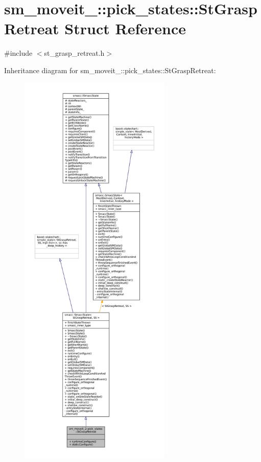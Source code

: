 \hypertarget{structsm__moveit__2_1_1pick__states_1_1StGraspRetreat}{}\section{sm\+\_\+moveit\+\_\+:\+:pick\+\_\+states\+:\+:St\+Grasp\+Retreat Struct Reference}
\label{structsm__moveit__2_1_1pick__states_1_1StGraspRetreat}


{\ttfamily \#include $<$st\+\_\+grasp\+\_\+retreat.\+h$>$}



Inheritance diagram for sm\+\_\+moveit\+\_\+:\+:pick\+\_\+states\+:\+:St\+Grasp\+Retreat\+:
\nopagebreak
\begin{figure}[H]
\begin{center}
\leavevmode
\includegraphics[height=550pt]{structsm__moveit__2_1_1pick__states_1_1StGraspRetreat__inherit__graph}
\end{center}
\end{figure}


